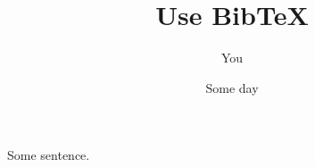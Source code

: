 \documentclass{article}
\title{Use BibTeX}
\author{You}
\date{Some day}
\begin{document}
    \maketitle

    Some sentence. \cite{knuth:1984}

    
    
\end{document}
